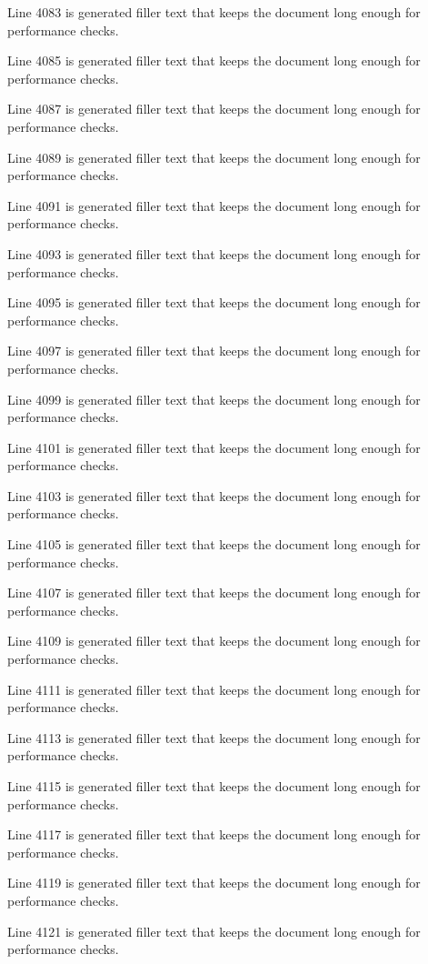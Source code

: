 Line 4083 is generated filler text that keeps the document long enough for performance checks.

Line 4085 is generated filler text that keeps the document long enough for performance checks.

Line 4087 is generated filler text that keeps the document long enough for performance checks.

Line 4089 is generated filler text that keeps the document long enough for performance checks.

Line 4091 is generated filler text that keeps the document long enough for performance checks.

Line 4093 is generated filler text that keeps the document long enough for performance checks.

Line 4095 is generated filler text that keeps the document long enough for performance checks.

Line 4097 is generated filler text that keeps the document long enough for performance checks.

Line 4099 is generated filler text that keeps the document long enough for performance checks.

Line 4101 is generated filler text that keeps the document long enough for performance checks.

Line 4103 is generated filler text that keeps the document long enough for performance checks.

Line 4105 is generated filler text that keeps the document long enough for performance checks.

Line 4107 is generated filler text that keeps the document long enough for performance checks.

Line 4109 is generated filler text that keeps the document long enough for performance checks.

Line 4111 is generated filler text that keeps the document long enough for performance checks.

Line 4113 is generated filler text that keeps the document long enough for performance checks.

Line 4115 is generated filler text that keeps the document long enough for performance checks.

Line 4117 is generated filler text that keeps the document long enough for performance checks.

Line 4119 is generated filler text that keeps the document long enough for performance checks.

Line 4121 is generated filler text that keeps the document long enough for performance checks.

